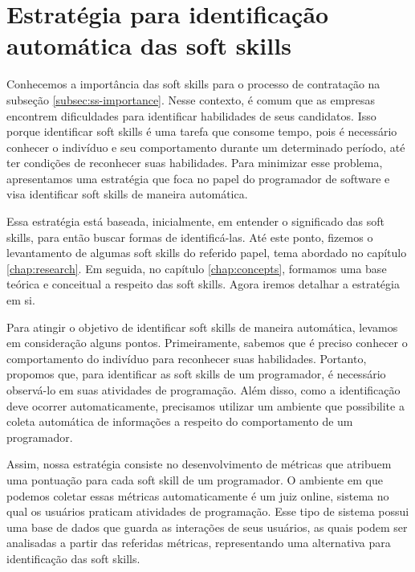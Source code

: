 

\chapter{Estratégia para identificação automática das soft skills}

\label{chap:metrics}

Conhecemos a importância das soft skills para o processo de contratação na subseção \ref{subsec:ss-importance}. Nesse contexto, é comum que as empresas encontrem dificuldades para identificar habilidades de seus candidatos. Isso porque identificar soft skills é uma tarefa que consome tempo, pois é necessário conhecer o indivíduo e seu comportamento durante um determinado período, até ter condições de reconhecer suas habilidades. Para minimizar esse problema, apresentamos uma estratégia que foca no papel do programador de software e visa identificar soft skills de maneira automática.


Essa estratégia está baseada, inicialmente, em entender o significado das soft skills, para então buscar formas de identificá-las.
Até este ponto, fizemos o levantamento de algumas soft skills do referido papel, tema abordado no capítulo \ref{chap:research}. Em seguida, no capítulo \ref{chap:concepts}, formamos uma base teórica e conceitual a respeito das soft skills.
Agora iremos detalhar a estratégia em si.

Para atingir o objetivo de identificar soft skills de maneira automática, levamos em consideração alguns pontos. Primeiramente, sabemos que é preciso conhecer o comportamento do indivíduo para reconhecer suas habilidades. Portanto, propomos que, para identificar as soft skills de um programador, é necessário observá-lo em suas atividades de programação. Além disso, como a identificação deve ocorrer automaticamente, precisamos utilizar um ambiente que possibilite a coleta automática de informações a respeito do comportamento de um programador.

Assim, nossa estratégia consiste no desenvolvimento de métricas que atribuem uma pontuação para cada soft skill de um programador. O ambiente em que podemos coletar essas métricas automaticamente é um juiz online, sistema no qual os usuários praticam atividades de programação. Esse tipo de sistema possui uma base de dados que guarda as interações de seus usuários, as quais podem ser analisadas a partir das referidas métricas, representando uma alternativa para identificação das soft skills.

